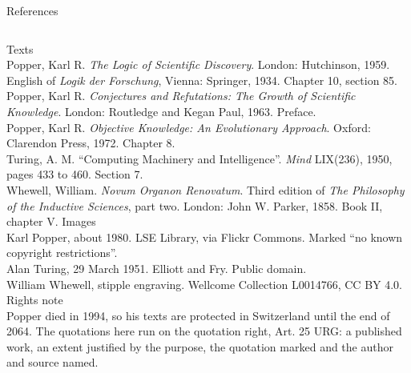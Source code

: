 \documentclass[aspectratio=169]{beamer}
\begin{document}
%
\begin{frame}{References}
  \vspace{1mm}
  {\scriptsize
  \begin{columns}[T]
      Texts\\[4pt]
      {\color{muted}
      Popper, Karl R. \textit{The Logic of Scientific Discovery}. London:
      Hutchinson, 1959. English of \textit{Logik der Forschung}, Vienna:
      Springer, 1934. Chapter 10, section 85.\\[4pt]
      Popper, Karl R. \textit{Conjectures and Refutations: The Growth of
      Scientific Knowledge}. London: Routledge and Kegan Paul, 1963. Preface.\\[4pt]
      Popper, Karl R. \textit{Objective Knowledge: An Evolutionary Approach}.
      Oxford: Clarendon Press, 1972. Chapter 8.\\[4pt]
      Turing, A. M. ``Computing Machinery and Intelligence''. \textit{Mind}
      LIX(236), 1950, pages 433 to 460. Section 7.\\[4pt]
      Whewell, William. \textit{Novum Organon Renovatum}. Third edition of
      \textit{The Philosophy of the Inductive Sciences}, part two. London:
      John W. Parker, 1858. Book II, chapter V.}
      Images\\[4pt]
      {\color{muted}
      Karl Popper, about 1980. LSE Library, via Flickr Commons. Marked
      ``no known copyright restrictions''.\\[4pt]
      Alan Turing, 29 March 1951. Elliott and Fry. Public domain.\\[4pt]
      William Whewell, stipple engraving. Wellcome Collection L0014766,
      CC BY 4.0.}\\[10pt]
      Rights note\\[4pt]
      {\color{muted}Popper died in 1994, so his texts are protected in
      Switzerland until the end of 2064. The quotations here run on the
      quotation right, Art. 25 URG: a published work, an extent justified by the
      purpose, the quotation marked and the author and source named.}
  \end{columns}}
\end{frame}
\end{document}

